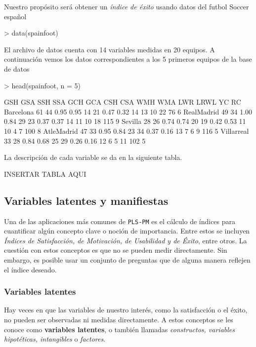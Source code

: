 \documentclass{paper}
\begin{document}
Nuestro prop\'osito ser\'a obtener un \emph{\'indice de \'exito} usando datos del futbol Soccer espa\~nol
\begin{Schunk}
\begin{Sinput}
> data(spainfoot)
\end{Sinput}
\end{Schunk}
El archivo de datos cuenta con 14 variables medidas en 20 equipos. A continuaci\'on vemos los datos correspondientes a los 5 primeros equipos de la base de datos
\begin{Schunk}
\begin{Sinput}
> head(spainfoot, n = 5)
\end{Sinput}
\begin{Soutput}
           GSH GSA  SSH  SSA GCH GCA  CSH  CSA WMH WMA LWR LRWL  YC RC
Barcelona   61  44 0.95 0.95  14  21 0.47 0.32  14  13  10   22  76  6
RealMadrid  49  34 1.00 0.84  29  23 0.37 0.37  14  11  10   18 115  9
Sevilla     28  26 0.74 0.74  20  19 0.42 0.53  11  10   4    7 100  8
AtleMadrid  47  33 0.95 0.84  23  34 0.37 0.16  13   7   6    9 116  5
Villarreal  33  28 0.84 0.68  25  29 0.26 0.16  12   6   5   11 102  5
\end{Soutput}
\end{Schunk}
La descripci\'on de cada variable se da en la siguiente tabla.



INSERTAR TABLA AQUI

\subsection{Variables latentes y manifiestas}

Una de las aplicaciones m\'as comunes de \texttt{PLS-PM} es el c\'alculo de \'indices para cuantificar alg\'un concepto clave o noci\'on de importancia. Entre estos se incluyen {\em \'Indices de Satisfacci\'on, de Motivaci\'on, de Usabilidad y de \'Exito}, entre otros. La cuesti\'on con estos conceptos es que no se pueden medir directamente. Sin embargo, es posible usar un conjunto de preguntas que de alguna manera reflejen el \'indice deseado.

\subsubsection{Variables latentes}

Hay veces en que las variables de nuestro inter\'es, como la satisfacci\'on o el \'exito, no pueden ser observadas ni medidas directamente. A estos conceptos se les conoce como {\bf variables latentes}, o tambi\'en llamadas {\em constructos, variables hipot\'eticas, intangibles} o {\em factores}.
\end{document}
